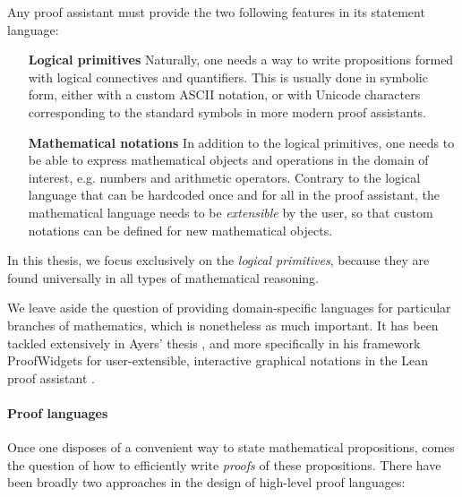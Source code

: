 Any proof assistant must provide the two following features in its statement
language:

\begin{itemize}
  \item[\textbf{Logical primitives}] Naturally, one needs a way to write
  propositions formed with logical connectives and quantifiers. This is usually
  done in symbolic form, either with a custom ASCII notation, or with Unicode
  characters corresponding to the standard symbols in more modern proof
  assistants. 
  \item[\textbf{Mathematical notations}] In addition to the logical primitives,
  one needs to be able to express mathematical objects and operations in the
  domain of interest, e.g. numbers and arithmetic operators. Contrary to the
  logical language that can be hardcoded once and for all in the proof
  assistant, the mathematical language needs to be \emph{extensible} by the
  user, so that custom notations can be defined for new mathematical objects.
\end{itemize}

\begin{emphpar}
  In this thesis, we focus exclusively on the \emph{logical primitives}, because
  they are found universally in all types of mathematical reasoning. 
\end{emphpar}

We leave aside the question of providing domain-specific languages for
particular branches of mathematics, which is nonetheless as much important. It
has been tackled extensively in Ayers' thesis , and more
specifically in his framework ProofWidgets for user-extensible, interactive
graphical notations in the Lean proof assistant .

\paragraph{Proof languages}

Once one disposes of a convenient way to state mathematical propositions, comes
the question of how to efficiently write \emph{proofs} of these propositions.
There have been broadly two approaches in the design of high-level proof
languages:


